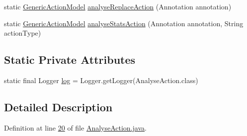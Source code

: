 \begin{DoxyCompactItemize}
\item 
static \hyperlink{interfacecom_1_1poly_1_1nlp_1_1filekommander_1_1views_1_1models_1_1_generic_action_model}{Generic\-Action\-Model} \hyperlink{classcom_1_1poly_1_1nlp_1_1filekommander_1_1file_1_1actions_1_1_analyse_action_a55c78bdeee6905c8e95f3d8115a6c222}{analyse\-Replace\-Action} (Annotation annotation)
\item 
static \hyperlink{interfacecom_1_1poly_1_1nlp_1_1filekommander_1_1views_1_1models_1_1_generic_action_model}{Generic\-Action\-Model} \hyperlink{classcom_1_1poly_1_1nlp_1_1filekommander_1_1file_1_1actions_1_1_analyse_action_a7bd195f986019e22721f048aec378f67}{analyse\-Stats\-Action} (Annotation annotation, String action\-Type)
\end{DoxyCompactItemize}
\subsection*{Static Private Attributes}
\begin{DoxyCompactItemize}
\item 
static final Logger \hyperlink{classcom_1_1poly_1_1nlp_1_1filekommander_1_1file_1_1actions_1_1_analyse_action_ae99df52b353dd7b0d2014d581fcc8cff}{log} = Logger.\-get\-Logger(Analyse\-Action.\-class)
\end{DoxyCompactItemize}


\subsection{Detailed Description}


Definition at line \hyperlink{L20}{20} of file \hyperlink{}{Analyse\-Action.\-java}.



